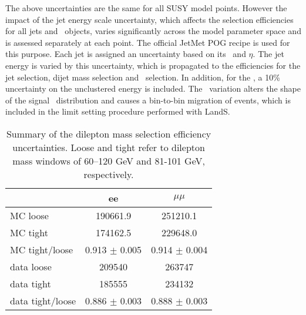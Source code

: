 The above uncertainties are the same for all SUSY model points. However the impact of the jet energy scale uncertainty, which
affects the selection efficiencies for all jets and \MET\ objects, varies significantly across the model parameter space and
is assessed separately at each point. The official JetMet POG recipe is used for this purpose. Each jet is assigned an uncertainty
based on its \pt\ and $\eta$. The jet energy is varied by this uncertainty, which is propagated to the efficiencies for the jet selection, 
dijet mass selection and \MET\ selection. In addition, for the \MET, a 10\% uncertainty on the unclustered energy is included.
The \MET\ variation alters the shape of the signal \MET\ distribution and causes a bin-to-bin migration of events, which is 
included in the limit setting procedure performed with LandS.

\begin{table}[htb]
\begin{center}
\footnotesize
\caption{\label{tab:mllsyst} Summary of the dilepton mass selection efficiency uncertainties. Loose and tight refer to dilepton
mass windows of 60--120 GeV and 81-101 GeV, respectively.}
\begin{tabular}{l|c|c}
\hline
\hline
 & ee & $\mu\mu$ \\
\hline
MC loose & 190661.9 & 251210.1 \\
MC tight & 174162.5 & 229648.0 \\  
MC tight/loose & 0.913 $\pm$ 0.005 & 0.914 $\pm$ 0.004 \\
\hline
data loose & 209540 & 263747 \\
data tight & 185555 & 234132 \\
data tight/loose & 0.886 $\pm$ 0.003 & 0.888 $\pm$ 0.003 \\
\hline
\hline
\end{tabular}
\end{center}
\end{table}

